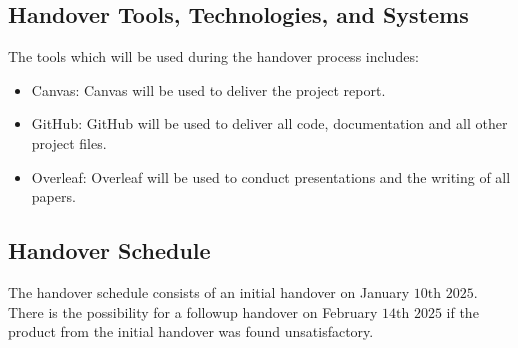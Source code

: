 \subsection{Handover Tools, Technologies, and Systems}

The tools which will be used during the handover process includes:
\begin{itemize}
    \item Canvas: Canvas will be used to deliver the project report.
    \item GitHub: GitHub will be used to deliver all code, documentation and all other project files.
    \item Overleaf: Overleaf will be used to conduct presentations and the writing of all papers.
\end{itemize}

\subsection{Handover Schedule}

The handover schedule consists of an initial handover on January $10\text{th}$ $2025$. There is the possibility for a followup handover on February $14\text{th}$ $2025$ if the product from the initial handover was found unsatisfactory.


